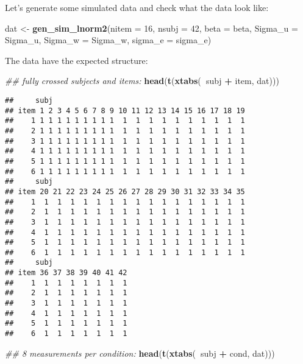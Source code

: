 \documentclass[12pt,]{krantz}
\newenvironment{Shaded}{\begin{snugshade}}{\end{snugshade}}
\newcommand{\CommentTok}[1]{\textcolor[rgb]{0.56,0.35,0.01}{\textit{#1}}}
\newcommand{\DataTypeTok}[1]{\textcolor[rgb]{0.13,0.29,0.53}{#1}}
\newcommand{\DecValTok}[1]{\textcolor[rgb]{0.00,0.00,0.81}{#1}}
\newcommand{\KeywordTok}[1]{\textcolor[rgb]{0.13,0.29,0.53}{\textbf{#1}}}
\newcommand{\NormalTok}[1]{#1}
\newcommand{\OperatorTok}[1]{\textcolor[rgb]{0.81,0.36,0.00}{\textbf{#1}}}
\newcommand{\StringTok}[1]{\textcolor[rgb]{0.31,0.60,0.02}{#1}}
\begin{document}
Let's generate some simulated data and check what the data look like:

\begin{Shaded}
\begin{Highlighting}[]
\NormalTok{dat <-}\StringTok{ }\KeywordTok{gen_sim_lnorm2}\NormalTok{(}\DataTypeTok{nitem =} \DecValTok{16}\NormalTok{, }\DataTypeTok{nsubj =} \DecValTok{42}\NormalTok{, }
  \DataTypeTok{beta =}\NormalTok{ beta, }\DataTypeTok{Sigma_u =}\NormalTok{ Sigma_u, }\DataTypeTok{Sigma_w =}\NormalTok{ Sigma_w, }
  \DataTypeTok{sigma_e =}\NormalTok{ sigma_e)}
\end{Highlighting}
\end{Shaded}

The data have the expected structure:

\begin{Shaded}
\begin{Highlighting}[]
\CommentTok{## fully crossed subjects and items:}
\KeywordTok{head}\NormalTok{(}\KeywordTok{t}\NormalTok{(}\KeywordTok{xtabs}\NormalTok{(}\OperatorTok{~}\NormalTok{subj }\OperatorTok{+}\StringTok{ }\NormalTok{item, dat)))}
\end{Highlighting}
\end{Shaded}

\begin{verbatim}
##     subj
## item 1 2 3 4 5 6 7 8 9 10 11 12 13 14 15 16 17 18 19
##    1 1 1 1 1 1 1 1 1 1  1  1  1  1  1  1  1  1  1  1
##    2 1 1 1 1 1 1 1 1 1  1  1  1  1  1  1  1  1  1  1
##    3 1 1 1 1 1 1 1 1 1  1  1  1  1  1  1  1  1  1  1
##    4 1 1 1 1 1 1 1 1 1  1  1  1  1  1  1  1  1  1  1
##    5 1 1 1 1 1 1 1 1 1  1  1  1  1  1  1  1  1  1  1
##    6 1 1 1 1 1 1 1 1 1  1  1  1  1  1  1  1  1  1  1
##     subj
## item 20 21 22 23 24 25 26 27 28 29 30 31 32 33 34 35
##    1  1  1  1  1  1  1  1  1  1  1  1  1  1  1  1  1
##    2  1  1  1  1  1  1  1  1  1  1  1  1  1  1  1  1
##    3  1  1  1  1  1  1  1  1  1  1  1  1  1  1  1  1
##    4  1  1  1  1  1  1  1  1  1  1  1  1  1  1  1  1
##    5  1  1  1  1  1  1  1  1  1  1  1  1  1  1  1  1
##    6  1  1  1  1  1  1  1  1  1  1  1  1  1  1  1  1
##     subj
## item 36 37 38 39 40 41 42
##    1  1  1  1  1  1  1  1
##    2  1  1  1  1  1  1  1
##    3  1  1  1  1  1  1  1
##    4  1  1  1  1  1  1  1
##    5  1  1  1  1  1  1  1
##    6  1  1  1  1  1  1  1
\end{verbatim}

\begin{Shaded}
\begin{Highlighting}[]
\CommentTok{## 8 measurements per condition:}
\KeywordTok{head}\NormalTok{(}\KeywordTok{t}\NormalTok{(}\KeywordTok{xtabs}\NormalTok{(}\OperatorTok{~}\NormalTok{subj }\OperatorTok{+}\StringTok{ }\NormalTok{cond, dat)))}
\end{Highlighting}
\end{Shaded}
\end{document}

